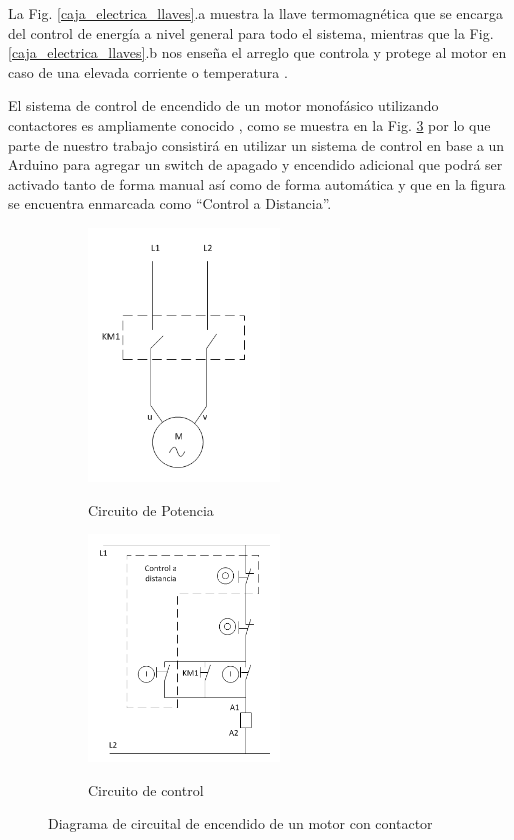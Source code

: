 \documentclass[main_conf.tex]{subfiles}
\begin{document}
La Fig. \ref{caja_electrica_llaves}.a muestra la llave termomagnética
que se encarga del control de energía a nivel general para todo el
sistema, mientras que la Fig. \ref{caja_electrica_llaves}.b nos enseña
el arreglo que controla y protege al motor en caso de 
una elevada corriente o temperatura \cite{Motor_control:schneider}.

El sistema de control de encendido de un motor monofásico utilizando
contactores es ampliamente conocido \cite{manual_electrotecnica:schneider},
como se muestra en la Fig. \ref{diag_control_on_off_motor} por lo que
parte de nuestro trabajo consistirá en utilizar un sistema de control en
base a un Arduino para agregar un switch de apagado y encendido adicional
que podrá ser activado tanto de forma manual así como de forma automática y
que en la figura se encuentra enmarcada como “Control a Distancia”.

\begin{figure}[t]
  \centering
  \begin{subfigure}[b]{0.5\textwidth}
    \centering
    \includegraphics[width=2.0in]{../img/caja_electrica/Circuito_de_potencia.png}
    \label{Circuito_de_potencia}
    \caption{Circuito de Potencia}
  \end{subfigure}

  \begin{subfigure}[b]{0.5\textwidth}
    \centering
    \includegraphics[width=2.0in]{../img/caja_electrica/Circuito_de_control.png}
    \label{Circuito_de_control}
    \caption{Circuito de control}
  \end{subfigure}

  \caption{Diagrama de circuital de encendido de un motor con contactor}
  \label{diag_control_on_off_motor}
\end{figure}
\end{document}
